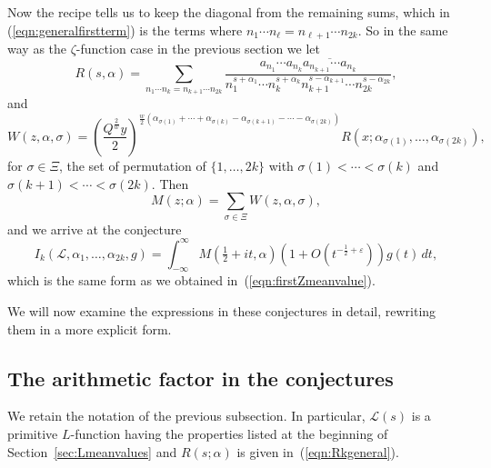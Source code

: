 \documentclass[12pt,letterpaper]{amsart}
\theoremstyle{plain}
\theoremstyle{definition}
\theoremstyle{remark}
\numberwithin{equation}{subsection}
\numberwithin{theorem}{subsection}
\numberwithin{table}{subsection}
\begin{document}
Now the recipe tells us to keep the diagonal from the remaining sums,
which in
(\ref{eqn:generalfirstterm}) is the terms where
$n_1 \cdots n_\ell=n_{\ell+1}\cdots n_{2k}$.  So in the same way
as the $\zeta$-function case in the previous section we let
\begin{equation}\label{eqn:Rkgeneral}
R(s,\alpha)=\sum_{n_1 \cdots n_k=n_{k+1}\cdots n_{2k}} 
        \frac{a_{n_1}\cdots a_{n_k}\overline{a_{n_{k+1}}\cdots 
           a_{n_k}}}
{n_1^{s +\alpha_1}\cdots n_k^{s +\alpha_k} 
n_{k+1}^{s -\alpha_{k+1}} \cdots n_{2k}^{s -\alpha_{2k}}},
\end{equation}
and
\begin{equation}
W(z,\alpha ,\sigma)=\left( \frac{Q^{\frac 2w}y}{2}\right)^{\frac{w}{2}
(\alpha _{\sigma(1)}+ \cdots + \alpha _{\sigma(k)} -\alpha
      _{\sigma(k+1)}-\cdots -\alpha _{\sigma(2k)})} 
R(x; \alpha _{\sigma(1)},\ldots,\alpha _{\sigma(2k)}),
 \end{equation}
for $\sigma\in\Xi$, the set of permutation of $\{1,\dots,2k\}$
with  $\sigma(1)<\cdots<\sigma(k)$ and
$\sigma(k+1)<\cdots< \sigma(2k)$.  Then
\begin{equation}
M(z;\alpha)=
\sum_{\sigma \in \Xi}
 W(z,\alpha ,\sigma), 
\end{equation}
and we arrive at the conjecture
\begin{equation}  
I_k(\mathcal{L},\alpha_1,\dots, \alpha_{2k},g)
=
\int_{-\infty}^\infty M(\tfrac12+it,\alpha)(1+O(t^{-\frac12 + \varepsilon}))g(t)\,dt ,
\end{equation}
which is the same form as we obtained in~(\ref{eqn:firstZmeanvalue}).

We will now examine the expressions in these conjectures in 
detail, rewriting them in a more explicit form.  


\subsection{ The arithmetic factor in the conjectures
} \label{sec:thearithmeticfactor}

We retain the notation of the previous subsection.  In particular,
$\mathcal{L}(s)$ is a primitive $L$-function having
the properties listed at the beginning of Section~\ref{sec:Lmeanvalues}
and
$R(s;\alpha)$ is given in~(\ref{eqn:Rkgeneral}). 
\end{document}
